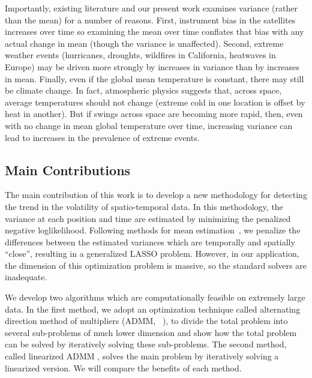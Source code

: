 \documentclass[letterpaper]{article} %
\newcommand{\citealp}[1]
{\citeauthor{#1} ~\citeyear{#1}}
\begin{document}
Importantly, existing literature and our present work examines variance (rather
than the mean) for a number of reasons. 
First, instrument bias in the satellites increases over time so
examining the mean over time conflates that bias with any actual
change in mean (though the variance is unaffected). 
Second, extreme weather events (hurricanes, droughts, wildfires in
California, heatwaves in Europe) may be driven more strongly by increases
in variance than by increases in mean. 
Finally, even if the global mean temperature is constant, there may still
be climate change. In fact, atmospheric physics suggests that,
across space, average temperatures should not change (extreme cold
in one location is offset by heat in another). But if swings across
space are becoming more rapid, then, even with no change in mean global
temperature over time, increasing variance can lead to
increases in the prevalence of extreme events. 






\subsection{Main Contributions}

The main contribution of this work is to develop a new methodology for
detecting the trend in the volatility of spatio-temporal data. In this
methodology, the variance at each position and time are estimated by
minimizing the penalized negative
loglikelihood. Following methods for mean estimation~\cite{Tibshirani2014}, we penalize the  
differences between the estimated variances which
are temporally and spatially ``close'', resulting
in a generalized LASSO problem. However, in our application, the
dimension of this optimization problem is massive, so the
standard solvers are inadequate. 

We develop two algorithms
which are computationally feasible on extremely large data. In the
first method, we adopt an optimization technique 
called alternating direction method of multipliers
(ADMM, \citealp{boyd_distributed_2011}), to divide the total problem into
several sub-problems of much lower dimension and show how the total
problem can be solved by iteratively solving these sub-problems. The
second method, called linearized ADMM
\cite{parikh_proximal_2014}, solves the main problem by iteratively
solving a linearized version. We will compare the benefits of
each method. 
\end{document}
